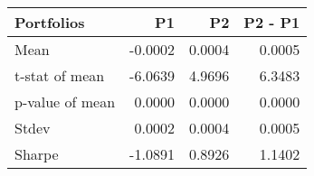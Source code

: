 \begin{tabular}{lrrr}
\toprule
Portfolios & P1 & P2 & P2 - P1 \\
\midrule
Mean & -0.0002 & 0.0004 & 0.0005 \\
t-stat of mean & -6.0639 & 4.9696 & 6.3483 \\
p-value of mean & 0.0000 & 0.0000 & 0.0000 \\
Stdev & 0.0002 & 0.0004 & 0.0005 \\
Sharpe & -1.0891 & 0.8926 & 1.1402 \\
\bottomrule
\end{tabular}
